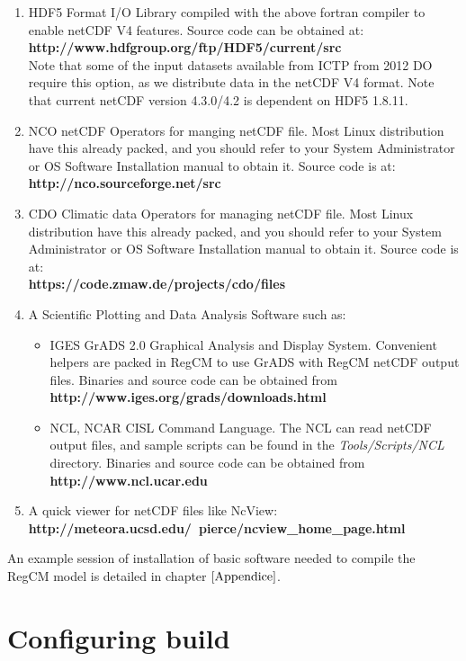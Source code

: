 \begin{enumerate}
\item HDF5 Format I/O Library compiled with the above fortran compiler to
enable netCDF V4 features. Source code can be obtained at: \\
{\bf http://www.hdfgroup.org/ftp/HDF5/current/src} \\
Note that some of the input datasets available from ICTP from 2012 DO require
this option, as we distribute data in the netCDF V4 format.
Note that current netCDF version 4.3.0/4.2 is dependent on HDF5 1.8.11.
\item NCO netCDF Operators for manging netCDF file. Most Linux distribution
have this already packed, and you should refer to your System Administrator or
OS Software Installation manual to obtain it. Source code is at: \\
{\bf http://nco.sourceforge.net/src}
\item CDO Climatic data Operators for managing netCDF file. Most Linux
distribution have this already packed, and you should refer to your System
Administrator or OS Software Installation manual to obtain it.
Source code is at: \\
{\bf https://code.zmaw.de/projects/cdo/files}
\item A Scientific Plotting and Data Analysis Software such as:
\begin{itemize}
\item IGES GrADS 2.0 Graphical Analysis and Display System. Convenient helpers
are packed in RegCM to use GrADS with RegCM netCDF output files.
Binaries and source code can be obtained from \\
{\bf http://www.iges.org/grads/downloads.html}
\item NCL, NCAR CISL Command Language. The NCL can read netCDF output files, and
sample scripts can be found in the {\em Tools/Scripts/NCL} directory.
Binaries and source code can be obtained from \\
{\bf http://www.ncl.ucar.edu}
\end{itemize}
\item A quick viewer for netCDF files like NcView: \\
{\bf http://meteora.ucsd.edu/~pierce/ncview\_home\_page.html}
\end{enumerate}

An example session of installation of basic software needed to compile the
RegCM model is detailed in chapter $\ref{Appendice}$.

\section{Configuring build}

